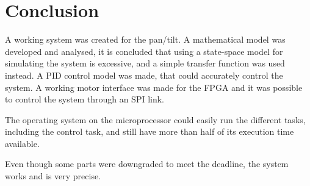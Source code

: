 \chapter{Conclusion}\label{chap:conclusion}

A working system was created for the pan/tilt. 
A mathematical model was developed and analysed, it is concluded that using a state-space model for simulating the system is excessive, and a simple transfer function was used instead.
A PID control model was made, that could accurately control the system.
A working motor interface was made for the FPGA and it was possible to control the system through an SPI link.


The operating system on the microprocessor could easily run the different tasks, including the control task, and still have more than half of its execution time available.


Even though some parts were downgraded to meet the deadline, the system works and is very precise.